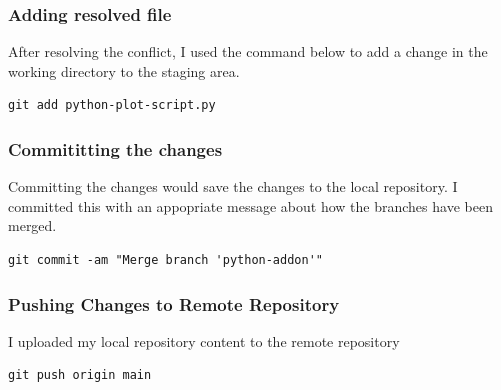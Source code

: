 \documentclass[]{article}
\begin{document}
\subsubsection{Adding resolved file}
After resolving the conflict, I used the command below to add a change in the working directory to the staging area.
\begin{tcolorbox}[colback=white, colframe=black, boxrule=1pt, arc=2mm, 
    fonttitle=\bfseries, listing only, listing options={language=sh, basicstyle=\ttfamily}]
\begin{verbatim}
git add python-plot-script.py
\end{verbatim}
\end{tcolorbox}

\clearpage

\subsubsection{Commititting the changes}
Committing the changes would save the changes to the local repository. I committed this with an appopriate message about how the
branches have been merged.
\begin{tcolorbox}[colback=white, colframe=black, boxrule=1pt, arc=2mm, 
    fonttitle=\bfseries, listing only, listing options={language=sh, basicstyle=\ttfamily}]
\begin{verbatim}
git commit -am "Merge branch 'python-addon'"
\end{verbatim}
\end{tcolorbox}

\subsubsection{Pushing Changes to Remote Repository}
I uploaded my local repository content to the remote repository 
\begin{tcolorbox}[colback=white, colframe=black, boxrule=1pt, arc=2mm, 
    fonttitle=\bfseries, listing only, listing options={language=sh, basicstyle=\ttfamily}]
\begin{verbatim}
git push origin main
\end{verbatim}
\end{tcolorbox}
\end{document}
